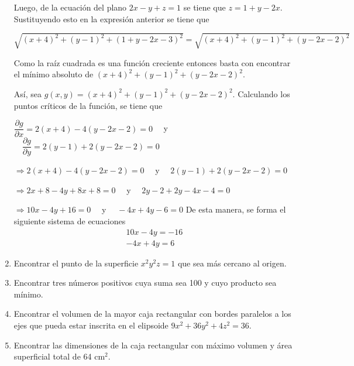 \documentclass[fleqn, 12pt]{article}
\newcommand{\derivadaparcial}[2]{\dfrac{\partial {#1}}{\partial {#2}}}
\begin{document}
\begin{enumerate}
        Luego, de la ecuación del plano $ 2x - y + z = 1 $ se tiene que $ z = 1 + y - 2x $. Sustituyendo esto en la expresión anterior se tiene que

        $ \sqrt{(x + 4)^2 + (y - 1)^2 + (1 + y - 2x - 3)^2} = \sqrt{(x + 4)^2 + (y - 1)^2 + (y - 2x - 2)^2} $

        Como la raíz cuadrada es una función creciente entonces basta con encontrar el mínimo absoluto de $ (x + 4)^2 + (y - 1)^2 + (y - 2x - 2)^2 $.

        Así, sea $ g(x,y) = (x + 4)^2 + (y - 1)^2 + (y - 2x - 2)^2 $. Calculando los puntos críticos de la función, se tiene que

        $ \derivadaparcial{g}{x} = 2(x + 4) - 4(y - 2x - 2) = 0 \quad $ y $ \quad \derivadaparcial{g}{y} = 2(y - 1) + 2(y - 2x - 2) = 0 $

        $ \Longrightarrow 2(x + 4) - 4(y - 2x - 2) = 0 \quad $ y $ \quad 2(y - 1) + 2(y - 2x - 2) = 0 $

        $ \Longrightarrow 2x + 8 - 4y + 8x + 8 = 0 \quad $ y $ \quad 2y - 2 + 2y - 4x - 4 = 0 $

        $ \Longrightarrow 10x - 4y + 16 = 0 \quad $ y $ \quad -4x + 4y - 6 = 0 $
        De esta manera, se forma el siguiente sistema de ecuaciones
        \begin{align}
            10x - 4y = -16 \label{eq:41} \\
            -4x + 4y = 6 \label{eq:42}
        \end{align}

        \item Encontrar el punto de la superficie $ x^2 y^2 z = 1 $ que sea más cercano al origen.
        
        
        \item Encontrar tres números positivos cuya suma sea 100 y cuyo producto sea mínimo.
    

        \item Encontrar el volumen de la mayor caja rectangular con bordes paralelos a los ejes que pueda estar inscrita en el elipsoide $ 9x^2 + 36y^2 + 4z^2 = 36 $.
        

        \item Encontrar las dimensiones de la caja rectangular con máximo volumen y área superficial total de 64 cm$ ^2 $.
        


\end{enumerate}
\end{document}
